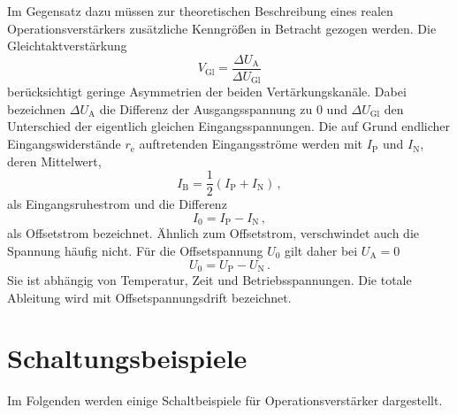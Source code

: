 \documentclass[
  bibliography=totoc,     %
  captions=tableheading,  %
  titlepage=firstiscover, %
]{scrartcl}
\begin{document}
\noindent
Im Gegensatz dazu müssen zur theoretischen Beschreibung eines realen
Operationsverstärkers zusätzliche Kenngrößen in Betracht gezogen werden.
\noindent
Die Gleichtaktverstärkung
\begin{equation}
\label{eq:gleichtaktverstärkung}
    V_\text{Gl} = \frac{\Delta U_\text{A}}{\Delta U_\text{Gl}}
\end{equation}
berücksichtigt geringe Asymmetrien der beiden Vertärkungskanäle.
Dabei bezeichnen $\Delta U_\text{A}$ die Differenz der Ausgangsspannung zu
\num{0} und $\Delta U_\text{Gl}$ den Unterschied der eigentlich gleichen
Eingangsspannungen.
\noindent
Die auf Grund endlicher Eingangswiderstände $r_\text{e}$ auftretenden
Eingangsströme werden mit $I_\text{P}$ und $I_\text{N}$, deren
Mittelwert,
\begin{equation}
\label{eq:eingangsruhestrom}
    I_\text{B} = \frac{1}{2}\left(I_\text{P} + I_\text{N}\right)\,,
\end{equation}
als Eingangsruhestrom und die Differenz
\begin{equation}
\label{eq:offsetstrom}
    I_0 = I_\text{P} - I_\text{N}\,,
\end{equation}
als Offsetstrom bezeichnet.
Ähnlich zum Offsetstrom, verschwindet auch die Spannung häufig nicht.
Für die Offsetspannung $U_0$ gilt daher bei $U_\text{A} = 0$
\begin{equation}
\label{eq:offsetspannung}
    U_0 = U_\text{P} - U_\text{N}\,.
\end{equation}
Sie ist abhängig von Temperatur, Zeit und Betriebsspannungen. Die totale
Ableitung wird mit Offsetspannungsdrift bezeichnet.


\section{Schaltungsbeispiele}
\label{sec:schaltungsbeispiele}
Im Folgenden werden einige Schaltbeispiele für Operationsverstärker
dargestellt.
\end{document}
